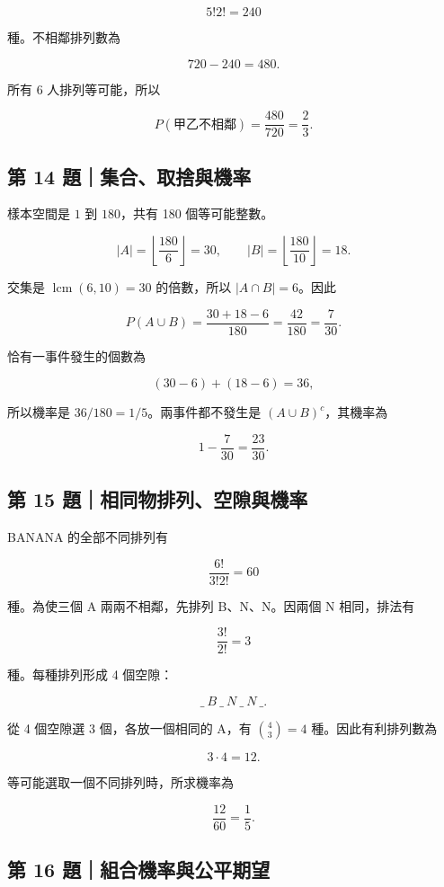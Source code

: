 \documentclass[11pt,a4paper]{article}
\begin{document}
\[
5!2!=240
\]

種。不相鄰排列數為

\[
720-240=480.
\]

所有 6 人排列等可能，所以

\[
P(\text{甲乙不相鄰})=\frac{480}{720}=\frac23.
\]

\subsection{第 14 題｜集合、取捨與機率}\label{ux7b2c-14-ux984cux96c6ux5408ux53d6ux6368ux8207ux6a5fux7387}

樣本空間是 \(1\) 到 \(180\)，共有 180 個等可能整數。

\[
|A|=\left\lfloor\frac{180}{6}\right\rfloor=30,
\qquad
|B|=\left\lfloor\frac{180}{10}\right\rfloor=18.
\]

交集是 \(\operatorname{lcm}(6,10)=30\) 的倍數，所以 \(|A\cap B|=6\)。因此

\[
P(A\cup B)=\frac{30+18-6}{180}
=\frac{42}{180}=\frac7{30}.
\]

恰有一事件發生的個數為

\[
(30-6)+(18-6)=36,
\]

所以機率是 \(36/180=1/5\)。兩事件都不發生是 \((A\cup B)^c\)，其機率為

\[
1-\frac7{30}=\frac{23}{30}.
\]

\subsection{第 15 題｜相同物排列、空隙與機率}\label{ux7b2c-15-ux984cux76f8ux540cux7269ux6392ux5217ux7a7aux9699ux8207ux6a5fux7387}

BANANA 的全部不同排列有

\[
\frac{6!}{3!2!}=60
\]

種。為使三個 A 兩兩不相鄰，先排列 B、N、N。因兩個 N 相同，排法有

\[
\frac{3!}{2!}=3
\]

種。每種排列形成 4 個空隙：

\[
\_\ B\ \_\ N\ \_\ N\ \_.
\]

從 4 個空隙選 3 個，各放一個相同的 A，有 \(\binom43=4\) 種。因此有利排列數為

\[
3\cdot4=12.
\]

等可能選取一個不同排列時，所求機率為

\[
\frac{12}{60}=\frac15.
\]

\subsection{第 16 題｜組合機率與公平期望}\label{ux7b2c-16-ux984cux7d44ux5408ux6a5fux7387ux8207ux516cux5e73ux671fux671b}
\end{document}
